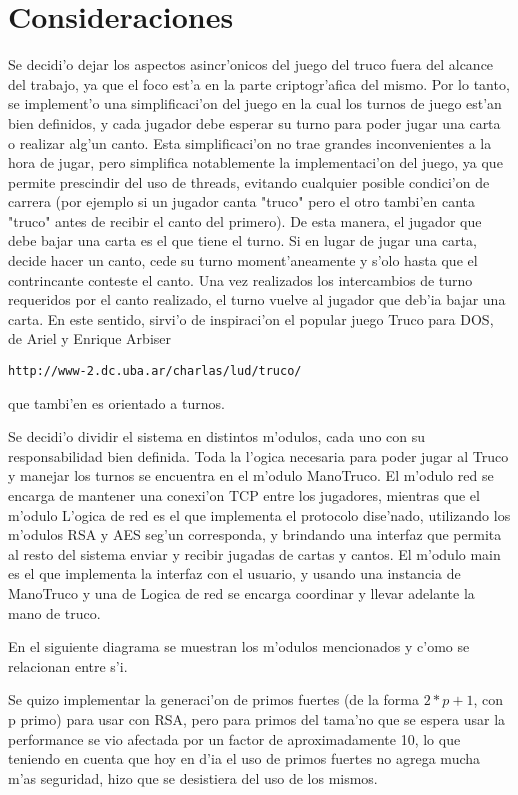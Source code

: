 \section{Consideraciones}
Se decidi'o dejar los aspectos asincr'onicos del juego del truco fuera del alcance del trabajo, ya que el foco est'a en la parte criptogr'afica del mismo.
Por lo tanto, se implement'o una simplificaci'on del juego en la cual los turnos de juego est'an bien definidos, y cada jugador debe esperar su turno para poder jugar una carta o realizar alg'un canto. Esta simplificaci'on no trae grandes inconvenientes a la hora de jugar, pero simplifica notablemente la implementaci'on del juego, ya que permite prescindir del uso de threads, evitando cualquier posible condici'on de carrera (por ejemplo si un jugador canta "truco" pero el otro tambi'en canta "truco" antes de recibir el canto del primero).
De esta manera, el jugador que debe bajar una carta es el que tiene el turno. Si en lugar de jugar una carta, decide hacer un canto, cede su turno moment'aneamente y s'olo hasta que el contrincante conteste el canto. Una vez realizados los intercambios de turno requeridos por el canto realizado, el turno vuelve al jugador que deb'ia bajar una carta.
En este sentido, sirvi'o de inspiraci'on el popular juego Truco para DOS, de Ariel y Enrique Arbiser

\begin{verbatim}
http://www-2.dc.uba.ar/charlas/lud/truco/
\end{verbatim}

que tambi'en es orientado a turnos.


Se decidi'o dividir el sistema en distintos m'odulos, cada uno con su responsabilidad bien definida. Toda la l'ogica necesaria para poder jugar al Truco y manejar los turnos se encuentra en el m'odulo ManoTruco. El m'odulo red se encarga de mantener una conexi'on TCP entre los jugadores, mientras que el m'odulo L'ogica de red es el que implementa el protocolo dise'nado, utilizando los m'odulos RSA y AES seg'un corresponda, y brindando una interfaz que permita al resto del sistema enviar y recibir jugadas de cartas y cantos. El m'odulo main es el que implementa la interfaz con el usuario, y usando una instancia de ManoTruco y una de Logica de red se encarga coordinar y llevar adelante la mano de truco.

En el siguiente diagrama se muestran los m'odulos mencionados y c'omo se relacionan entre s'i.



Se quizo implementar la generaci'on de primos fuertes (de la forma $2 * p + 1$, con p primo) para usar con RSA, pero para primos del tama'no que se espera usar la performance se vio afectada por un factor de aproximadamente 10, lo que teniendo en cuenta que hoy en d'ia el uso de primos fuertes no agrega mucha m'as seguridad, hizo que se desistiera del uso de los mismos.
